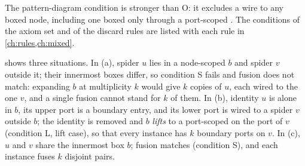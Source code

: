 The pattern-diagram condition is stronger than O: it excludes a wire to any boxed node, including
one boxed only through a port-scoped \bbox{}. The \bbox{} conditions of the axiom set and of the
discard rules are listed with each rule in \cref{ch:rules,ch:mixed}.


\begin{example}\label{ex:rewriting-boxcond}
 shows three situations. In (a), spider $u$ lies in a node-scoped
\bbox{} $b$ and spider $v$ outside it; their innermost boxes differ, so condition S fails and fusion
does not match: expanding $b$ at multiplicity $k$ would give $k$ copies of $u$, each wired to the
one $v$, and a single fusion cannot stand for $k$ of them. In (b), identity $u$ is alone in $b$, its
upper port is a boundary entry, and its lower port is wired to a spider $v$ outside $b$; the
identity is removed and $b$ \emph{lifts} to a port-scoped \bbox{} on the port of $v$ (condition L,
lift case), so that every instance has $k$ boundary ports on $v$. In (c), $u$ and $v$ share the
innermost box $b$; fusion matches (condition S), and each instance fuses $k$ disjoint pairs.
\end{example}

